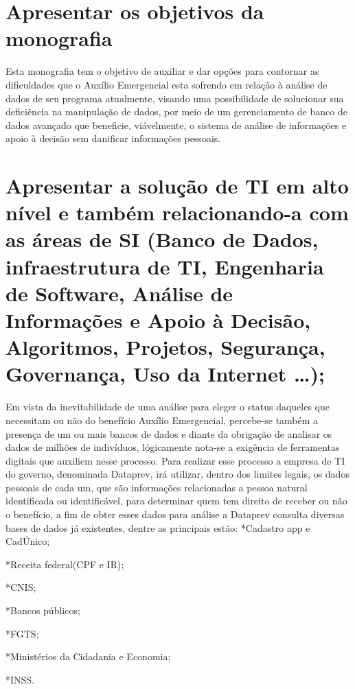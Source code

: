 \documentclass[12pt]{article}
\begin{document}
\section{Apresentar os objetivos da monografia}
	Esta monografia tem o objetivo de auxiliar e dar opções para contornar as dificuldades que o Auxílio Emergencial esta sofrendo em relação à análise de dados de seu programa atualmente, visando uma possibilidade de solucionar sua deficiência na manipulação de dados, por meio de um gerenciamento de banco de dados avançado que beneficie, viávelmente, o sistema de análise de informações e apoio à decisão sem danificar informações pessoais.

\section{Apresentar a solução de TI em alto nível e também relacionando-a com as áreas de SI (Banco de Dados, infraestrutura de TI, Engenharia de Software, Análise de Informações e Apoio à Decisão, Algoritmos, Projetos, Segurança, Governança, Uso da Internet …);}
	Em vista da inevitabilidade de uma análise para eleger o status daqueles que necessitam ou não do benefício Auxílio Emergencial, percebe-se também a presença de um ou mais bancos de dados e diante da obrigação de analisar os dados de milhões de indivíduos, lógicamente nota-se a exigência de ferramentas digitais que auxiliem nesse processo. Para realizar esse processo a empresa de TI do governo, denominada Dataprev, irá utilizar, dentro dos limites legais, os dados pessoais de cada um, que são informações relacionadas a pessoa natural identificada ou identificável, para determinar quem tem direito de receber ou não o benefício, a fim de obter esses dados para análise a Dataprev consulta diversas bases de dados já existentes, dentre as principais estão:
*Cadastro app e CadÚnico;

*Receita federal(CPF e IR);

*CNIS;

*Bancos públicos; 

*FGTS;

*Ministérios da Cidadania e Economia; 

*INSS.
\end{document}
